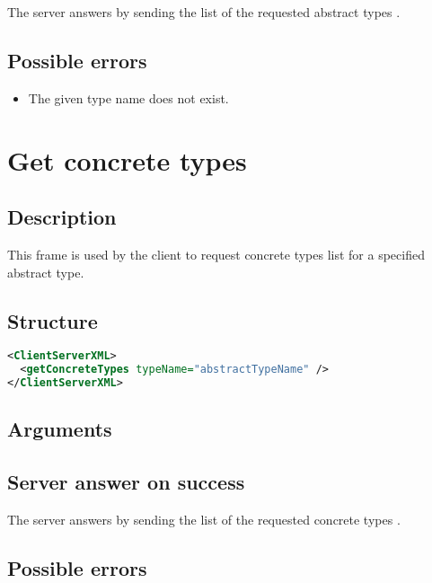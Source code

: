 The server answers by sending the list of the requested abstract types
.

\subsection{Possible errors}

\begin{itemize}
 \item The given type name does not exist.
\end{itemize}


\section{Get concrete types}
\label{getConcreteType}

\subsection{Description}

This frame is used by the client to request concrete types list for a specified
abstract type.

\subsection{Structure}

\begin{lstlisting}[language=XML]
<ClientServerXML>
  <getConcreteTypes typeName="abstractTypeName" />
</ClientServerXML>
\end{lstlisting}

\subsection{Arguments}

\subsection{Server answer on success}

The server answers by sending the list of the requested concrete types
.

\subsection{Possible errors}

